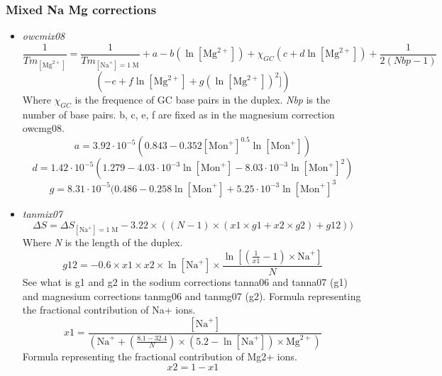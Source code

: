 \documentclass{article}
\begin{document}
\subsubsection{Mixed Na Mg corrections} 
 \begin{itemize}
 \item \textit{owcmix08}
 \begin{displaymath}
 \frac{1}{Tm_{[\mbox{Mg}^{2+}]}} = \frac{1}{Tm_{[\mbox{Na}^+]=1\;\mathrm{M}}} + a
 - b (\ln [\mbox{Mg}^{2+}]) + \chi_{GC} (c + d \ln [\mbox{Mg}^{2+}]) + \frac{1}{2 (Nbp-1)} 
 \end{displaymath}
 \begin{displaymath}
 (-e + f \ln [\mbox{Mg}^{2+}] + g (\ln [\mbox{Mg}^{2+}])^{2}])
 \end{displaymath}
 Where \emph{$\chi_{GC}$} is the frequence of GC base pairs in the duplex.
 \emph{Nbp} is the number of base pairs.
 b, c, e, f are fixed as in the magnesium correction owcmg08.
 \begin{displaymath}
 a = 3.92\cdot{}10^{-5} (0.843 - 0.352 [\mbox{Mon}^+]^{0.5} \ln [\mbox{Mon}^+]) 
 \end{displaymath}
 \begin{displaymath}
 d = 1.42\cdot{}10^{-5} (1.279 - 4.03\cdot{}10^{-3} \ln [\mbox{Mon}^+] -
 8.03\cdot{}10^{-3} \ln [\mbox{Mon}^+]^{2})
 \end{displaymath}
 \begin{displaymath}
 g = 8.31\cdot{}10^{-5} (0.486 - 0.258 \ln [\mbox{Mon}^+] + 5.25\cdot{}10^{-3}
 \ln [\mbox{Mon}^+]^{3} 
 \end{displaymath}
 \item \textit{tanmix07}
 \begin{displaymath}
 \Delta{}S=\Delta{}S_{[\mbox{Na}^+]=1\;\mathrm{M}}- 3.22 \times ((N - 1) \times (x1 \times g1 + x2 \times g2) + g12))  
 \end{displaymath}
 Where \emph{N} is the length of the duplex.
 \begin{displaymath}
  g12 = -0.6 \times x1 \times x2 \times \ln [\mbox{Na}^+] \times \frac{\ln [(\frac{1}{x1} - 1) \times \mbox{Na}^+]}{N}  
 \end{displaymath}
  See what is g1 and g2 in the sodium corrections tanna06 and tanna07 (g1) and
  magnesium corrections tanmg06 and tanmg07 (g2).
  Formula representing the fractional contribution of Na+ ions.
 \begin{displaymath}
  x1 = \frac{[\mbox{Na}^+]}{(\mbox{Na}^+ + (\frac{8.1 - 32.4}{N}) \times (5.2 - \ln [\mbox{Na}^+]) \times \mbox{Mg}^{2+})}  
 \end{displaymath}
 Formula representing the fractional contribution of Mg2+ ions.
 \begin{displaymath}
  x2= 1-x1  
 \end{displaymath}
 \end{itemize}
\end{document}
